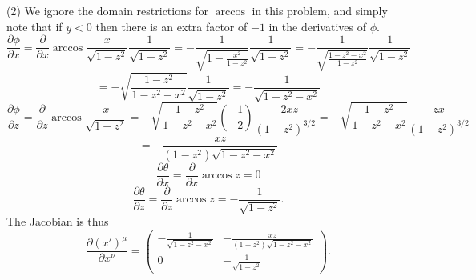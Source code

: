 \documentclass[11pt, letterpaper]{article}
\theoremstyle{plain}
\begin{document}
(2) We ignore the domain restrictions for $\arccos $ in this problem, and simply note that if $y<0$ then there is an extra factor of $-1$ in the derivatives of $\phi $.
\[
	\frac{\partial \phi }{\partial x} =\frac{\partial }{\partial x} \arccos \frac{x}{\sqrt{1-z^2} } \frac{1}{\sqrt{1-z^2} }=-\frac{1}{\sqrt{1-\frac{x^2}{1-z^2} } }\frac{1}{\sqrt{1-z^2} } =-\frac{1}{\sqrt{\frac{1-z^2-x^2}{1-z^2} } }\frac{1}{\sqrt{1-z^2} } 
\]
\[
	=-\sqrt{\frac{1-z^2}{1-z^2-x^2} } \frac{1}{\sqrt{1-z^2} }=-\frac{1}{\sqrt{1-z^2-x^2} } 
\]
\[
	\frac{\partial \phi }{\partial z} =\frac{\partial }{\partial z} \arccos \frac{x}{\sqrt{1-z^2} } =-\sqrt{\frac{1-z^2}{1-z^2-x^2} } \left( -\frac{1}{2}  \right) \frac{-2xz}{\left( 1-z^2 \right) ^{3/2} } =-\sqrt{\frac{1-z^2}{1-z^2-x^2} } \frac{zx}{\left( 1-z^2 \right) ^{3/2} } 
\]
\[
	=-\frac{xz}{\left( 1-z^2 \right) \sqrt{1-z^2-x^2} } 
\]
\[
	\frac{\partial \theta }{\partial x} =\frac{\partial }{\partial x} \arccos z=0
\]
\[
	\frac{\partial \theta }{\partial z} =\frac{\partial }{\partial z} \arccos z=-\frac{1}{\sqrt{1-z^2} } 
.\]
The Jacobian is thus
\[
	\frac{\partial (x')^\mu }{\partial x^\nu } =\begin{pmatrix}
		\displaystyle{-\frac{1}{\sqrt{1-z^2-x^2} }}   & \displaystyle{-\frac{xz}{\left( 1-z^2 \right) \sqrt{1-z^2-x^2 }} }  \\
		0 & \displaystyle{-\frac{1}{\sqrt{1-z^2} } }
	\end{pmatrix}
.\]
\end{document}
